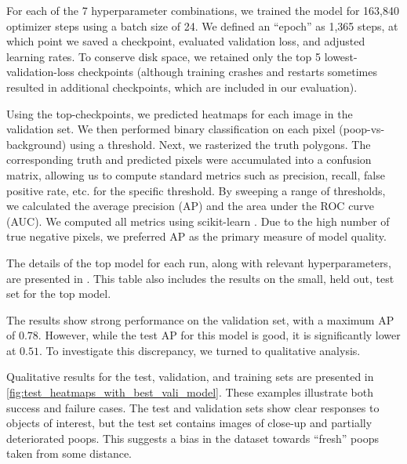\begin{comment}
    SeeAlso:
    ~/code/shitspotter/experiments/geowatch-experiments/run_pixel_eval_on_vali_pipeline.sh
    python ~/code/shitspotter/dev/poc/estimate_train_resources.py
\end{comment}

For each of the 7 hyperparameter combinations, we trained the model for 163,840 optimizer steps using a
  batch size of 24.
We defined an ``epoch'' as 1,365 steps, at which point we saved a checkpoint, evaluated validation loss, and
  adjusted learning rates.
To conserve disk space, we retained only the top 5 lowest-validation-loss checkpoints (although training
  crashes and restarts sometimes resulted in additional checkpoints, which are included in our evaluation).

Using the top-checkpoints, we predicted heatmaps for each image in the validation set.
We then performed binary classification on each pixel (poop-vs-background) using a threshold.
Next, we rasterized the truth polygons.
The corresponding truth and predicted pixels were accumulated into a confusion matrix, allowing us to
  compute standard metrics such as precision, recall, false positive rate, etc.
\cite{powers_evaluation_2011} for the specific threshold.
By sweeping a range of thresholds, we calculated the average precision (AP) and the area under the ROC curve
  (AUC).
We computed all metrics using scikit-learn \cite{scikit-learn}.
Due to the high number of true negative pixels, we preferred AP as the primary measure of model quality.
  
The details of the top model for each run, along with relevant hyperparameters, are presented in
  .
This table also includes the results on the small, held out, test set for the top model.

The results show strong performance on the validation set, with a maximum AP of $0.78$.
However, while the test AP for this model is good, it is significantly lower at $0.51$.
To investigate this discrepancy, we turned to qualitative analysis.

Qualitative results for the test, validation, and training sets are presented in
  \cref{fig:test_heatmaps_with_best_vali_model}.
These examples illustrate both success and failure cases.
The test and validation sets show clear responses to objects of interest, but the test set contains images
  of close-up and partially deteriorated poops.
This suggests a bias in the dataset towards ``fresh'' poops taken from some distance.

